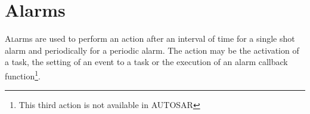 
\chapter{Alarms}
\label{chap:alarms}

\lettrine{A}larms are used to perform an action after an interval of time for a single shot alarm and periodically for a periodic alarm. The action may be the activation of a task, the setting of an event to a task or the execution of an alarm callback function\footnote{This third action is not available in AUTOSAR}.



